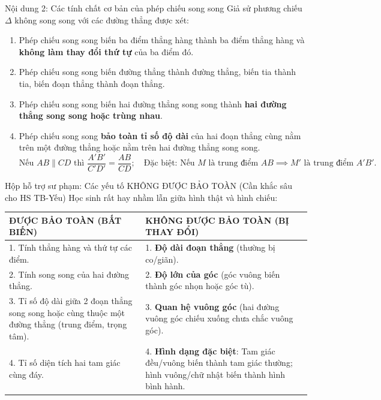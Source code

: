 \documentclass[12pt, a4paper]{article}
\begin{document}
\begin{pedabox}{Nội dung 2: Các tính chất cơ bản của phép chiếu song song}
Giả sử phương chiếu $\Delta$ không song song với các đường thẳng được xét:
\begin{enumerate}[leftmargin=0.6cm]
    \item Phép chiếu song song biến ba điểm thẳng hàng thành ba điểm thẳng hàng và \textbf{không làm thay đổi thứ tự} của ba điểm đó.
    \item Phép chiếu song song biến đường thẳng thành đường thẳng, biến tia thành tia, biến đoạn thẳng thành đoạn thẳng.
    \item Phép chiếu song song biến hai đường thẳng song song thành \textbf{hai đường thẳng song song hoặc trùng nhau}.
    \item Phép chiếu song song \textbf{bảo toàn tỉ số độ dài} của hai đoạn thẳng cùng nằm trên một đường thẳng hoặc nằm trên hai đường thẳng song song.
    $$\text{Nếu } AB \parallel CD \text{ thì } \dfrac{A'B'}{C'D'} = \dfrac{AB}{CD}; \quad \text{Đặc biệt: Nếu } M \text{ là trung điểm } AB \implies M' \text{ là trung điểm } A'B'.$$
\end{enumerate}
\end{pedabox}

\begin{scaffoldbox}{Hộp hỗ trợ sư phạm: Các yếu tố KHÔNG ĐƯỢC BẢO TOÀN (Cần khắc sâu cho HS TB-Yếu)}
Học sinh rất hay nhầm lẫn giữa hình thật và hình chiếu:
\begin{center}
\small
\begin{tabularx}{\textwidth}{|X|X|}
\hline
\textbf{ĐƯỢC BẢO TOÀN (BẤT BIẾN)} & \textbf{KHÔNG ĐƯỢC BẢO TOÀN (BỊ THAY ĐỔI)} \\ \hline
1. Tính thẳng hàng và thứ tự các điểm. & 1. \textbf{Độ dài đoạn thẳng} (thường bị co/giãn). \\ \hline
2. Tính song song của hai đường thẳng. & 2. \textbf{Độ lớn của góc} (góc vuông biến thành góc nhọn hoặc góc tù). \\ \hline
3. Tỉ số độ dài giữa 2 đoạn thẳng song song hoặc cùng thuộc một đường thẳng (trung điểm, trọng tâm). & 3. \textbf{Quan hệ vuông góc} (hai đường vuông góc chiếu xuống chưa chắc vuông góc). \\ \hline
4. Tỉ số diện tích hai tam giác cùng đáy. & 4. \textbf{Hình dạng đặc biệt}: Tam giác đều/vuông biến thành tam giác thường; hình vuông/chữ nhật biến thành hình bình hành. \\ \hline
\end{tabularx}
\end{center}
\end{scaffoldbox}
\end{document}
